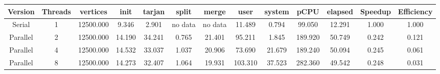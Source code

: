 \begin{tabular}{|c|c|c|c|c|c|c|c|c|c|c|c|c|}
\toprule
 Version &  Threads &  vertices &   init &  tarjan &   split &   merge &    user &  system &    pCPU &  elapsed &  Speedup &  Efficiency \\
\midrule
  Serial &        1 & 12500.000 &  9.346 &   2.901 & no data & no data &  11.489 &   0.794 &  99.050 &   12.291 &    1.000 &       1.000 \\
Parallel &        2 & 12500.000 & 14.190 &  34.241 &   0.765 &  21.401 &  95.211 &   1.845 & 189.920 &   50.749 &    0.242 &       0.121 \\
Parallel &        4 & 12500.000 & 14.532 &  33.037 &   1.037 &  20.906 &  73.690 &  21.679 & 189.240 &   50.094 &    0.245 &       0.061 \\
Parallel &        8 & 12500.000 & 14.273 &  32.407 &   1.064 &  19.931 & 103.310 &  37.523 & 282.360 &   49.542 &    0.248 &       0.031 \\
\bottomrule
\end{tabular}
